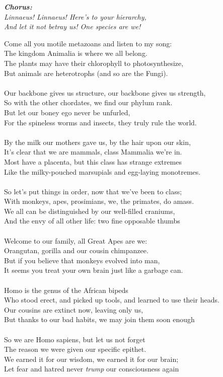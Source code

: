\documentclass[twoside,16pt,openany,letterpaper]{memoir}%
\newcommand\customchorus[2]{
  \quad\Large\textit{\textbf{#1}}\\\normalsize\textit{#2}
}
\newcommand\chorus[1]{
  \customchorus{Chorus:}{#1}
}
\begin{document}
\chorus{
  Linnaeus! Linnaeus! Here’s to your hierarchy,\\
  And let it not betray us! One species are we!\\
}

Come all you motile metazoans and listen to my song:\\
The kingdom Animalia is where we all belong.\\
The plants may have their chlorophyll to photosynthesize,\\
But animals are heterotrophs (and so are the Fungi).\\
\\
Our backbone gives us structure, our backbone gives us strength,\\
So with the other chordates, we find our phylum rank.\\
But let our boney ego never be unfurled,\\
For the spineless worms and insects, they truly rule the world.\\
\\
By the milk our mothers gave us, by the hair upon our skin,\\
It’s clear that we are mammals, class Mammalia we’re in.\\
Most have a placenta, but this class has strange extremes\\
Like the milky-pouched marsupials and egg-laying monotremes.\\
\\
So let’s put things in order, now that we’ve been to class;\\
With monkeys, apes, prosimians, we, the primates, do amass.\\
We all can be distinguished by our well-filled craniums,\\
And the envy of all other life: two fine opposable thumbs\\
\\
Welcome to our family, all Great Apes are we:\\
Orangutan, gorilla and our cousin chimpanzee.\\
But if you believe that monkeys evolved into man,\\
It seems you treat your own brain just like a garbage can.\\
\\
Homo is the genus of the African bipeds\\
Who stood erect, and picked up tools, and learned to use their heads.\\
Our cousins are extinct now, leaving only us,\\
But thanks to our bad habits, we may join them soon enough\\
\\
So we are Homo sapiens, but let us not forget\\
The reason we were given our specific epithet.\\
We earned it for our wisdom, we earned it for our brain;\\
Let fear and hatred never \textit{trump} our consciousness again\\
\end{document}
